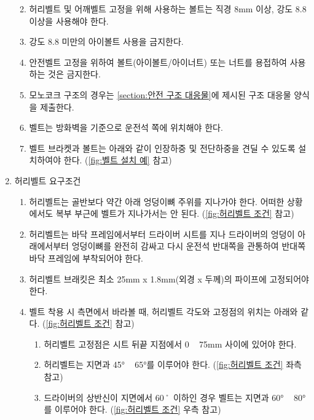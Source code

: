 \documentclass[final,a4paper,10pt]{report}
\begin{document}
\begin{enumerate}
\begin{enumerate}
        
        \item 허리벨트 및 어깨벨트 고정을 위해 사용하는 볼트는 직경 8mm 이상, 강도 8.8 이상을 사용해야 한다.
        \item 강도 8.8 미만의 아이볼트 사용을 금지한다.
        \item 안전벨트 고정을 위하여 볼트(아이볼트/아이너트) 또는 너트를 용접하여 사용하는 것은 금지한다.
        \item 모노코크 구조의 경우는 \cref{section:안전 구조 대응물}에 제시된 구조 대응물 양식을 제출한다. \label{item:모노코크 안전벨트 접합부}
        \item 벨트는 방화벽을 기준으로 운전석 쪽에 위치해야 한다.
        \item 벨트 브라켓과 볼트는 아래와 같이 인장하중 및 전단하중을 견딜 수 있도록 설치하여야 한다. (\cref{fig:벨트 설치 예} 참고)
        
      \end{enumerate}
    \item 허리벨트 요구조건
      \begin{enumerate}
        \item 허리벨트는 골반보다 약간 아래 엉덩이뼈 주위를 지나가야 한다. 어떠한 상황에서도 복부 부근에 벨트가 지나가서는 안 된다. (\cref{fig:허리벨트 조건} 참고)
        \item 허리벨트는 바닥 프레임에서부터 드라이버 시트를 지나 드라이버의 엉덩이 아래에서부터 엉덩이뼈를 완전히 감싸고 다시 운전석 반대쪽을 관통하여 반대쪽 바닥 프레임에 부착되어야 한다.
        \item 허리벨트 브래킷은 최소 25mm x 1.8mm(외경 x 두께)의 파이프에 고정되어야 한다.
        
        \item 벨트 착용 시 측면에서 바라볼 때, 허리벨트 각도와 고정점의 위치는 아래와 같다. (\cref{fig:허리벨트 조건} 참고)
          \begin{enumerate}
            \item 허리벨트 고정점은 시트 뒤끝 지점에서 0 \string~ 75mm 사이에 있어야 한다.
            \item 허리벨트는 지면과 45° \string~ 65°를 이루어야 한다. (\cref{fig:허리벨트 조건} 좌측 참고)
            \item 드라이버의 상반신이 지면에서 60˚ 이하인 경우 벨트는 지면과 60° \string~ 80°를 이루어야 한다. (\cref{fig:허리벨트 조건} 우측 참고)
          \end{enumerate}
        

\end{enumerate}
\end{enumerate}
\end{document}

